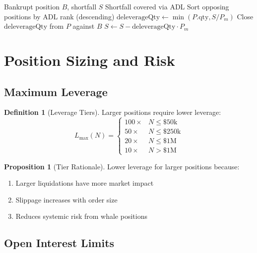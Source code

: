 \documentclass[11pt,a4paper]{article}
\theoremstyle{definition}
\newtheorem{definition}{Definition}
\newtheorem{proposition}{Proposition}
\begin{document}
\begin{algorithm}
\caption{Auto-Deleveraging}
\begin{algorithmic}[1]
\Require Bankrupt position $B$, shortfall $S$
\Ensure Shortfall covered via ADL
\State Sort opposing positions by ADL rank (descending)
\State $\text{deleverageQty} \gets \min(P.\text{qty}, S / P_m)$
\State Close $\text{deleverageQty}$ from $P$ against $B$
\State $S \gets S - \text{deleverageQty} \cdot P_m$
\EndFor
\end{algorithmic}
\end{algorithm}

\section{Position Sizing and Risk}

\subsection{Maximum Leverage}

\begin{definition}[Leverage Tiers]
Larger positions require lower leverage:
\begin{equation}
L_{\max}(N) = \begin{cases}
100\times & N \leq \$50\text{k} \\
50\times & N \leq \$250\text{k} \\
20\times & N \leq \$1\text{M} \\
10\times & N > \$1\text{M}
\end{cases}
\end{equation}
\end{definition}

\begin{proposition}[Tier Rationale]
Lower leverage for larger positions because:
\begin{enumerate}
\item Larger liquidations have more market impact
\item Slippage increases with order size
\item Reduces systemic risk from whale positions
\end{enumerate}
\end{proposition}

\subsection{Open Interest Limits}
\end{document}
